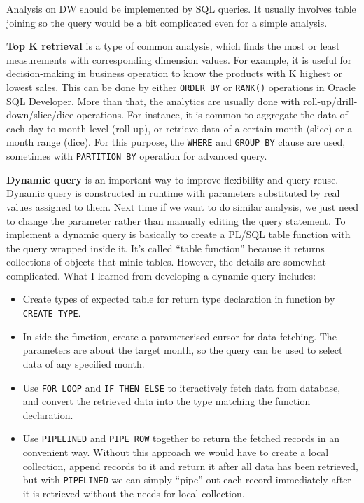 \documentclass[
  a4paper,
]{article}
\providecommand{\tightlist}{%
  \setlength{\itemsep}{0pt}\setlength{\parskip}{0pt}}
\begin{document}
Analysis on DW should be implemented by SQL queries. It usually involves
table joining so the query would be a bit complicated even for a simple
analysis.

\textbf{Top K retrieval} is a type of common analysis, which finds the
most or least measurements with corresponding dimension values. For
example, it is useful for decision-making in business operation to know
the products with K highest or lowest sales. This can be done by either
\texttt{ORDER\ BY} or \texttt{RANK()} operations in Oracle SQL
Developer. More than that, the analytics are usually done with
roll-up/drill-down/slice/dice operations. For instance, it is common to
aggregate the data of each day to month level (roll-up), or retrieve
data of a certain month (slice) or a month range (dice). For this
purpose, the \texttt{WHERE} and \texttt{GROUP\ BY} clause are used,
sometimes with \texttt{PARTITION\ BY} operation for advanced query.

\textbf{Dynamic query} is an important way to improve flexibility and
query reuse. Dynamic query is constructed in runtime with parameters
substituted by real values assigned to them. Next time if we want to do
similar analysis, we just need to change the parameter rather than
manually editing the query statement. To implement a dynamic query is
basically to create a PL/SQL table function with the query wrapped
inside it. It's called ``table function'' because it returns collections
of objects that minic tables. However, the details are somewhat
complicated. What I learned from developing a dynamic query includes:

\begin{itemize}
\tightlist
\item
  Create types of expected table for return type declaration in function
  by \texttt{CREATE\ TYPE}.
\item
  In side the function, create a parameterised cursor for data fetching.
  The parameters are about the target month, so the query can be used to
  select data of any specified month.
\item
  Use \texttt{FOR\ LOOP} and \texttt{IF\ THEN\ ELSE} to iteractively
  fetch data from database, and convert the retrieved data into the type
  matching the function declaration.
\item
  Use \texttt{PIPELINED} and \texttt{PIPE\ ROW} together to return the
  fetched records in an convenient way. Without this approach we would
  have to create a local collection, append records to it and return it
  after all data has been retrieved, but with \texttt{PIPELINED} we can
  simply ``pipe'' out each record immediately after it is retrieved
  without the needs for local collection.
\end{itemize}

\printbibliography
\end{document}
